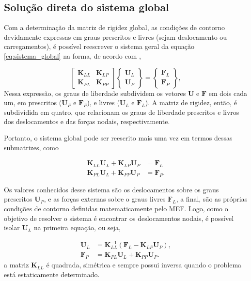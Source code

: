 \subsection{Solução direta do sistema global}

Com a determinação da matriz de rigidez global, as condições de contorno devidamente expressas em graus prescritos e livres (sejam deslocamento ou carregamentos), é possível reescrever o sistema geral da equação \ref{eq:sistema_global} na forma, de acordo com ,

\begin{equation}
    \begin{bmatrix}
        \bm{K}_{LL} & \bm{K}_{LP} \\
        \bm{K}_{PL} & \bm{K}_{PP}
    \end{bmatrix} 
    \begin{Bmatrix}
        \bm{U}_L \\ \bm{U}_P
    \end{Bmatrix}
    = \begin{Bmatrix}
        \bm{F}_L \\ \bm{F}_P
    \end{Bmatrix},
\end{equation}
Nessa expressão, os graus de liberdade subdividem os vetores $\bm{U}$ e $\bm{F}$ em dois cada um, em prescritos ($\bm{U}_P$ e $\bm{F}_P$), e livres ($\bm{U}_L$ e $\bm{F}_L$). A matriz de rigidez, então, é subdividida em quatro, que relacionam os graus de liberdade prescritos e livros dos deslocamentos e das forças nodais, respectivamente.

Portanto, o sistema global pode ser reescrito mais uma vez em termos dessas submatrizes, como

\begin{align}
    \bm{K}_{LL} \bm{U}_L + \bm{K}_{LP} \bm{U}_P &= \bm{F}_L \\
    \bm{K}_{PL} \bm{U}_L + \bm{K}_{PP} \bm{U}_P &= \bm{F}_P.
\end{align}

Os valores conhecidos desse sistema são os deslocamentos sobre os graus prescritos $\bm{U}_P$, e as forças externas sobre o graus livres $\bm{F}_L$, a final, são as próprias condições de contorno definidas matematicamente pelo MEF. Logo, como o objetivo de resolver o sistema é encontrar os deslocamentos nodais, é possível isolar $\bm{U}_L$ na primeira equação, ou seja,

\begin{align}
    \bm{U}_L &= \bm{K}_{LL}^{-1} (\bm{F}_L - \bm{K}_{LP} \bm{U}_P), \\
    \bm{F}_P &= \bm{K}_{PL} \bm{U}_L + \bm{K}_{PP} \bm{U}_P.
\end{align}
a matriz $\bm{K}_{LL}$ é quadrada, simétrica e sempre possui inversa quando o problema está estaticamente determinado. \cite{rao}

